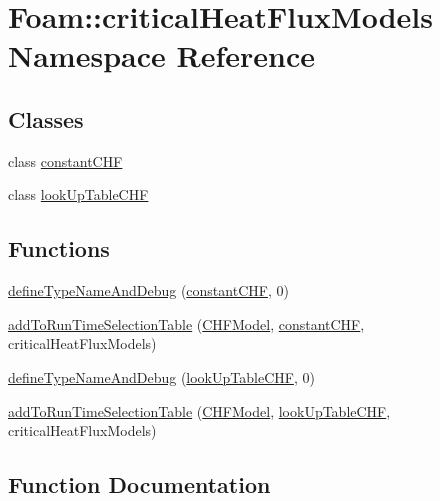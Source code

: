 \hypertarget{namespaceFoam_1_1criticalHeatFluxModels}{}\section{Foam\+:\+:critical\+Heat\+Flux\+Models Namespace Reference}
\label{namespaceFoam_1_1criticalHeatFluxModels}
\subsection*{Classes}
\begin{DoxyCompactItemize}
\item 
class \hyperlink{classFoam_1_1criticalHeatFluxModels_1_1constantCHF}{constant\+C\+HF}
\item 
class \hyperlink{classFoam_1_1criticalHeatFluxModels_1_1lookUpTableCHF}{look\+Up\+Table\+C\+HF}
\end{DoxyCompactItemize}
\subsection*{Functions}
\begin{DoxyCompactItemize}
\item 
\hyperlink{namespaceFoam_1_1criticalHeatFluxModels_a1342289283e87cbfe1afb5f35d7d9ace}{define\+Type\+Name\+And\+Debug} (\hyperlink{classFoam_1_1criticalHeatFluxModels_1_1constantCHF}{constant\+C\+HF}, 0)
\item 
\hyperlink{namespaceFoam_1_1criticalHeatFluxModels_a026104d1fab4088b2ae232c33dafd5ae}{add\+To\+Run\+Time\+Selection\+Table} (\hyperlink{classFoam_1_1CHFModel}{C\+H\+F\+Model}, \hyperlink{classFoam_1_1criticalHeatFluxModels_1_1constantCHF}{constant\+C\+HF}, critical\+Heat\+Flux\+Models)
\item 
\hyperlink{namespaceFoam_1_1criticalHeatFluxModels_a085ec610c2c983d6c29bda0d3e4ec1a8}{define\+Type\+Name\+And\+Debug} (\hyperlink{classFoam_1_1criticalHeatFluxModels_1_1lookUpTableCHF}{look\+Up\+Table\+C\+HF}, 0)
\item 
\hyperlink{namespaceFoam_1_1criticalHeatFluxModels_a1aa2f47173f30829f9245afb6f02b073}{add\+To\+Run\+Time\+Selection\+Table} (\hyperlink{classFoam_1_1CHFModel}{C\+H\+F\+Model}, \hyperlink{classFoam_1_1criticalHeatFluxModels_1_1lookUpTableCHF}{look\+Up\+Table\+C\+HF}, critical\+Heat\+Flux\+Models)
\end{DoxyCompactItemize}


\subsection{Function Documentation}
\mbox{\label{namespaceFoam_1_1criticalHeatFluxModels_a1342289283e87cbfe1afb5f35d7d9ace}} 
